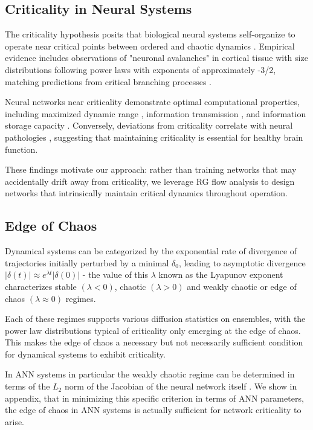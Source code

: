 \subsection{Criticality in Neural Systems}

The criticality hypothesis posits that biological neural systems self-organize to operate near critical points between ordered and chaotic dynamics \cite{Beggsetal2003, Beggsetal2012}. Empirical evidence includes observations of "neuronal avalanches" in cortical tissue with size distributions following power laws with exponents of approximately -3/2, matching predictions from critical branching processes \cite{Beggsetal2003}. 

Neural networks near criticality demonstrate optimal computational properties, including maximized dynamic range \cite{Kinouchietal2006, Shewetal2009}, information transmission \cite{Beggsetal2012}, and information storage capacity \cite{Bertschingeretal2004}. Conversely, deviations from criticality correlate with neural pathologies \cite{Meiseletal2011}, suggesting that maintaining criticality is essential for healthy brain function.

These findings motivate our approach: rather than training networks that may accidentally drift away from criticality, we leverage RG flow analysis to design networks that intrinsically maintain critical dynamics throughout operation.

\subsection{Edge of Chaos}

Dynamical systems can be categorized by the exponential rate of divergence of trajectories initially perturbed by a minimal $\delta_0$, leading to asymptotic divergence $|\delta(t)| \approx e^{\lambda t}|\delta(0)|$ - the value of this $\lambda$ known as the Lyapunov exponent characterizes stable $(\lambda < 0)$, chaotic $(\lambda > 0)$ and weakly chaotic or edge of chaos $(\lambda\approx 0)$ regimes\cite{}.

Each of these regimes supports various diffusion statistics on ensembles, with the power law distributions typical of criticality only emerging at the edge of chaos. This makes the edge of chaos a necessary but not necessarily sufficient condition for dynamical systems to exhibit criticality. \cite{}

In ANN systems in particular the weakly chaotic regime can be determined in terms of the $L_2$ norm of the Jacobian of the neural network itself \cite{}. We show in appendix, that in minimizing this specific criterion in terms of ANN parameters, the edge of chaos in ANN systems is actually sufficient for network criticality to arise. 